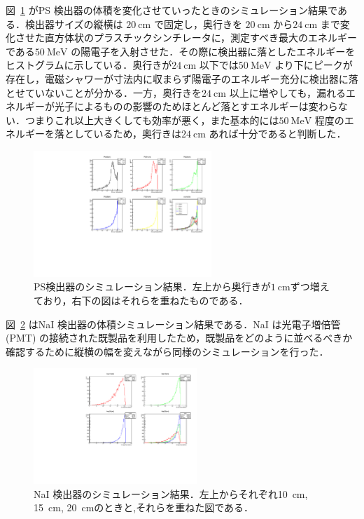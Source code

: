 図~\ref{PS_sim} がPS 検出器の体積を変化させていったときのシミュレーション結果である．検出器サイズの縦横は $20~\mathrm{cm}$ で固定し，奥行きを $20~\mathrm{cm}$ から$24~\mathrm{cm}$ まで変化させた直方体状のプラスチックシンチレータに，測定すべき最大のエネルギーである$50~\mathrm{MeV}$ の陽電子を入射させた．その際に検出器に落としたエネルギーをヒストグラムに示している．奥行きが$24~\mathrm{cm}$ 以下では$50~\mathrm{MeV}$ より下にピークが存在し，電磁シャワーが寸法内に収まらず陽電子のエネルギー充分に検出器に落とせていないことが分かる．一方，奥行きを$24~\mathrm{cm}$ 以上に増やしても，漏れるエネルギーが光子によるものの影響のためほとんど落とすエネルギーは変わらない．つまりこれ以上大きくしても効率が悪く，また基本的には$50~\mathrm{MeV}$ 程度のエネルギーを落としているため，奥行きは$24~\mathrm{cm}$ あれば十分であると判断した．
\begin{figure}[H]
\centering
\includegraphics[width=0.6\textwidth]{figure/hayakawa/pl_20_24.pdf}
\caption{PS検出器のシミュレーション結果．左上から奥行きが$1~\mathrm{cm}$ずつ増えており，右下の図はそれらを重ねたものである． }
\label{PS_sim}
\end{figure}

図~\ref{NaI_sim} はNaI 検出器の体積シミュレーション結果である．NaI は光電子増倍管 (PMT) の接続された既製品を利用したため，既製品をどのように並べるべきか確認するために縦横の幅を変えながら同様のシミュレーションを行った．

\begin{figure}[H]
\centering
\includegraphics[width=0.55\textwidth,angle=-90]{figure/hayakawa/NaI_10_20.pdf}
\caption{NaI 検出器のシミュレーション結果．左上からそれぞれ10~cm, 15~cm, 20~cmのときと,それらを重ねた図である．}
\label{NaI_sim}
\end{figure}

